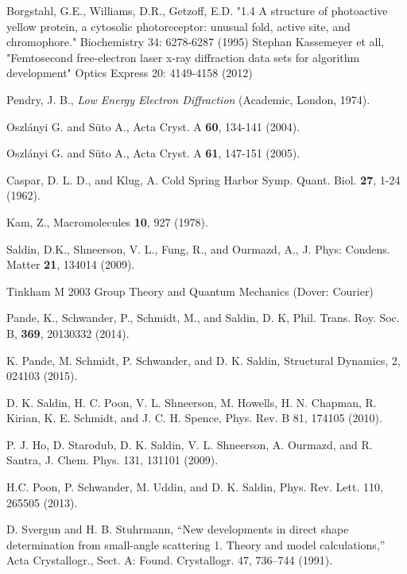 \begin{thebibliography}{99}
 Borgstahl, G.E., Williams, D.R., Getzoff, E.D. "1.4 A structure of photoactive yellow protein, a cytosolic photoreceptor: unusual fold, active site, and chromophore."  Biochemistry 34: 6278-6287 (1995)
 Stephan Kassemeyer et all, "Femtosecond free-electron laser x-ray diffraction data sets for algorithm development" Optics Express 20: 4149-4158 (2012)

 Pendry, J. B., {\it Low Energy Electron Diffraction} (Academic, London, 1974).

 Oszl\'{a}nyi G. and S\"{u}to A., Acta Cryst. A {\bf 60}, 134-141 (2004).

 Oszl\'{a}nyi G. and S\"{u}to A., Acta Cryst. A {\bf 61}, 147-151 (2005). 

 Caspar, D. L. D., and Klug, A. Cold Spring Harbor Symp. Quant. Biol. {\bf 27}, 1-24 (1962).

 Kam, Z., Macromolecules {\bf 10}, 927 (1978).

 Saldin, D.K., Shneerson, V. L., Fung, R., and Ourmazd, A., J. Phys: Condens. Matter {\bf 21}, 134014 (2009).

Tinkham M 2003 Group Theory and Quantum Mechanics (Dover: Courier)

 Pande, K., Schwander, P., Schmidt, M., and  Saldin, D. K, Phil. Trans. Roy. Soc. B,  {\bf 369}, 20130332 (2014).

 K. Pande, M. Schmidt, P. Schwander, and D. K. Saldin, Structural Dynamics, 2, 024103 (2015).

 D. K. Saldin, H. C. Poon, V. L. Shneerson, M. Howells, H. N. Chapman, R. Kirian, K. E. Schmidt, and J. C. H. Spence, Phys. Rev. B 81, 174105 (2010).

 P. J. Ho, D. Starodub, D. K. Saldin, V. L. Shneerson, A. Ourmazd, and R. Santra, J. Chem. Phys. 131, 131101 (2009).

 H.C. Poon, P. Schwander, M. Uddin, and D. K. Saldin, Phys. Rev. Lett. 110, 265505 (2013).

 D. Svergun and H. B. Stuhrmann, “New developments in direct shape determination from small-angle scattering 1. Theory and model calculations,” Acta Crystallogr., Sect. A: Found. Crystallogr. 47, 736–744 (1991).


\end{thebibliography}
